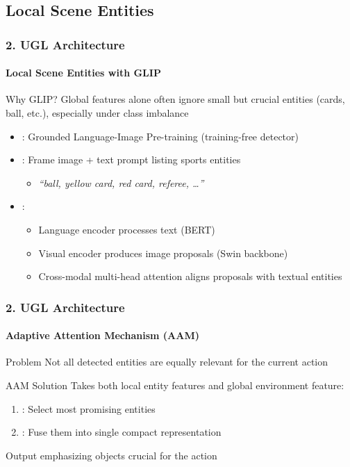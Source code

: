 \documentclass[aspectratio=169, lecture, amberg]{OTHAWbeamer}
\begin{document}
\subsection{Local Scene Entities}

\begin{frame}
\frametitle{2. UGL Architecture}
\framesubtitle{Local Scene Entities with GLIP}
\begin{block}{Why GLIP?}
Global features alone often ignore small but crucial entities (cards, ball, etc.), especially under class imbalance
\end{block}

\begin{itemize}
\item {}: Grounded Language-Image Pre-training (training-free detector)
\item {}: Frame image + text prompt listing sports entities
	\begin{itemize}
	\item \textit{``ball, yellow card, red card, referee, \ldots''}
	\end{itemize}
\item {}: 
	\begin{itemize}
	\item Language encoder processes text (BERT)
	\item Visual encoder produces image proposals (Swin backbone)
	\item Cross-modal multi-head attention aligns proposals with textual entities
	\end{itemize}
\end{itemize}
\end{frame}

\begin{frame}
\frametitle{2. UGL Architecture}
\framesubtitle{Adaptive Attention Mechanism (AAM)}
\begin{block}{Problem}
Not all detected entities are equally relevant for the current action
\end{block}

\begin{block}{AAM Solution}
Takes both local entity features and global environment feature:
\begin{enumerate}
\item {}: Select most promising entities
\item {}: Fuse them into single compact representation
\end{enumerate}
\end{block}

\begin{block}{Output}
 emphasizing objects crucial for the action
\end{block}
\end{frame}
\end{document}

